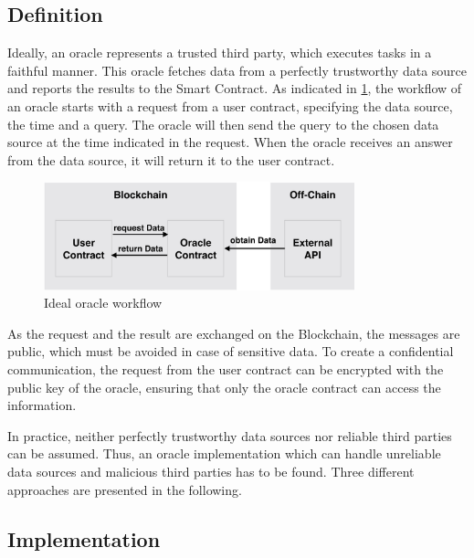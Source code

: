 \documentclass[conference]{IEEEtran}
\begin{document}
\subsection{Definition}
Ideally, an oracle represents a trusted third party, which executes tasks in a faithful manner. This oracle fetches data from a perfectly trustworthy data source and reports the results to the Smart Contract. As indicated in \ref{idealOracle}, the workflow of an oracle starts with a request from a user contract, specifying the data source, the time and a query. The oracle will then send the query to the chosen data source at the time indicated in the request. When the oracle receives an answer from the data source, it will return it to the user contract. \cite{Ellis2017} \par 
\begin{figure}[h]
	\begin{center}
		\includegraphics[width=9cm]{idealOracle.png}
		\caption{Ideal oracle workflow}
		\label{idealOracle}
	\end{center}
\end{figure} 
As the request and the result are exchanged on the Blockchain, the messages are public, which must be avoided in case of sensitive data. To create a confidential communication, the request from the user contract can be encrypted with the public key of the oracle, ensuring that only the oracle contract can access the information. \cite{Ellis2017} \par
In practice, neither perfectly trustworthy data sources nor reliable third parties can be assumed. Thus, an oracle implementation which can handle unreliable data sources and malicious third parties has to be found. Three different approaches are presented in the following. \cite{Mik2017} 
\subsection{Implementation}
\end{document}
